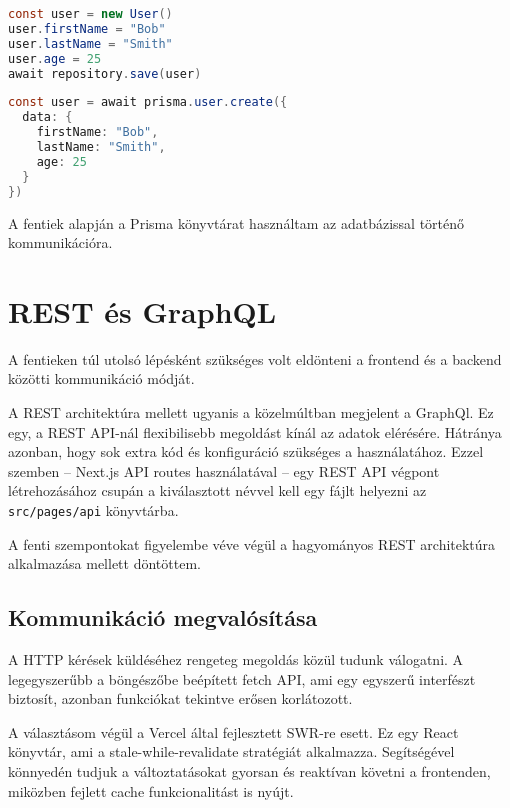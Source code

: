 \begin{lstlisting}[language=Java, caption=Adatbázis beillesztés TypeORM környezetben]
const user = new User()
user.firstName = "Bob"
user.lastName = "Smith"
user.age = 25
await repository.save(user)
\end{lstlisting}

\begin{lstlisting}[language=Java, caption=Adatbázis beillesztés Prisma segítségével]
const user = await prisma.user.create({
  data: {
    firstName: "Bob",
    lastName: "Smith",
    age: 25
  }
})
\end{lstlisting}

A fentiek alapján a Prisma könyvtárat használtam az adatbázissal történő kommunikációra. \cite{Prisma}

\section{REST és GraphQL}

A fentieken túl utolsó lépésként szükséges volt eldönteni a frontend és a backend közötti kommunikáció módját.

A REST architektúra mellett ugyanis a közelmúltban megjelent a GraphQl. Ez egy, a REST API-nál flexibilisebb megoldást
kínál az adatok elérésére. Hátránya azonban, hogy sok extra kód és konfiguráció szükséges a használatához.
Ezzel szemben -- Next.js API routes használatával -- egy REST API végpont létrehozásához csupán a kiválasztott névvel kell egy fájlt
helyezni az \lstinline|src/pages/api| könyvtárba.

A fenti szempontokat figyelembe véve végül a hagyományos REST architektúra alkalmazása mellett döntöttem. \cite{REST}

\subsection{Kommunikáció megvalósítása}

A HTTP kérések küldéséhez rengeteg megoldás közül tudunk válogatni.
A legegyszerűbb a böngészőbe beépített fetch API\cite{fetchAPI}, ami egy egyszerű interfészt biztosít, azonban funkciókat tekintve erősen korlátozott.

A választásom végül a Vercel által fejlesztett SWR-re\cite{SWR} esett. Ez egy React könyvtár, ami a stale-while-revalidate
stratégiát alkalmazza. Segítségével könnyedén tudjuk a változtatásokat gyorsan és reaktívan követni a frontenden, miközben fejlett cache
funkcionalitást is nyújt.

